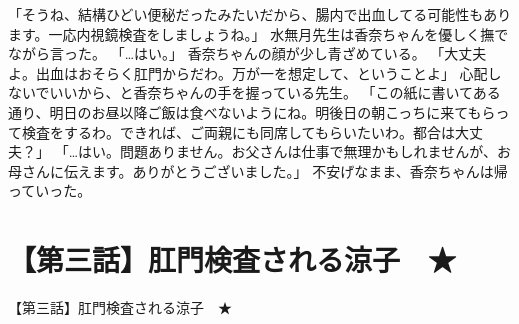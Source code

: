 「そうね、結構ひどい便秘だったみたいだから、腸内で出血してる可能性もあります。一応内視鏡検査をしましょうね。」
水無月先生は香奈ちゃんを優しく撫でながら言った。
「…はい。」
香奈ちゃんの顔が少し青ざめている。
「大丈夫よ。出血はおそらく肛門からだわ。万が一を想定して、ということよ」
心配しないでいいから、と香奈ちゃんの手を握っている先生。
「この紙に書いてある通り、明日のお昼以降ご飯は食べないようにね。明後日の朝こっちに来てもらって検査をするわ。できれば、ご両親にも同席してもらいたいわ。都合は大丈夫？」
「…はい。問題ありません。お父さんは仕事で無理かもしれませんが、お母さんに伝えます。ありがとうございました。」
不安げなまま、香奈ちゃんは帰っていった。


\section{【第三話】肛門検査される涼子　★}
【第三話】肛門検査される涼子　★



